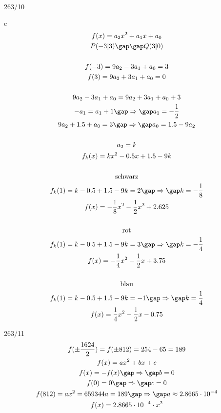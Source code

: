 \begin{exercise}{263/10}
  \item [c]
  \begin{gather*}
    f(x) = a_2x^2 + a_1x + a_0 \\
    P(-3|3) \gap\gap Q(3|0) \\\\
    f(-3) = 9a_2 - 3a_1 + a_0 = 3 \\
    f(3) = 9a_2 + 3a_1 + a_0 = 0 \\\\
    9a_2 - 3a_1 + a_0 = 9a_2 + 3a_1 + a_0 + 3 \\
    -a_1 = a_1 + 1 \gap\Rightarrow\gap a_1 = -\frac{1}{2} \\
    9a_2 + 1.5 + a_0 = 3 \gap\Rightarrow\gap a_0 = 1.5 - 9a_2 \\\\
    a_2 = k \\
    f_k(x) = kx^2 - 0.5x + 1.5 - 9k \\\\
    \text{schwarz} \\
    f_k(1) = k - 0.5 + 1.5 - 9k = 2 \gap\Rightarrow\gap k = -\frac{1}{8} \\
    f(x) = -\frac{1}{8}x^2 - \frac{1}{2}x^2 + 2.625 \\\\
    \text{rot} \\
    f_k(1) = k - 0.5 + 1.5 - 9k = 3 \gap\Rightarrow\gap k = -\frac{1}{4} \\
    f(x) = -\frac{1}{4}x^2 - \frac{1}{2}x + 3.75 \\\\
    \text{blau} \\
    f_k(1) = k - 0.5 + 1.5 - 9k = -1 \gap\Rightarrow\gap k = \frac{1}{4} \\
    f(x) = \frac{1}{4}x^2 - \frac{1}{2}x - 0.75
  \end{gather*}
\end{exercise}
\newpage
\begin{exercise}{263/11}
  \begin{gather*}
    f(\pm\frac{1624}{2}) = f(\pm812) = 254 - 65 = 189 \\
    f(x) = ax^2 + bx + c \\
    f(x) = -f(x) \gap\Rightarrow\gap b = 0 \\
    f(0) = 0 \gap\Rightarrow\gap c = 0 \\
    f(812) = ax^2 = 659344a = 189 \gap\Rightarrow\gap a \approx 2.8665 \cdot 10^{-4} \\
    f(x) = 2.8665 \cdot 10^{-4} \cdot x^2
  \end{gather*}
\end{exercise}
